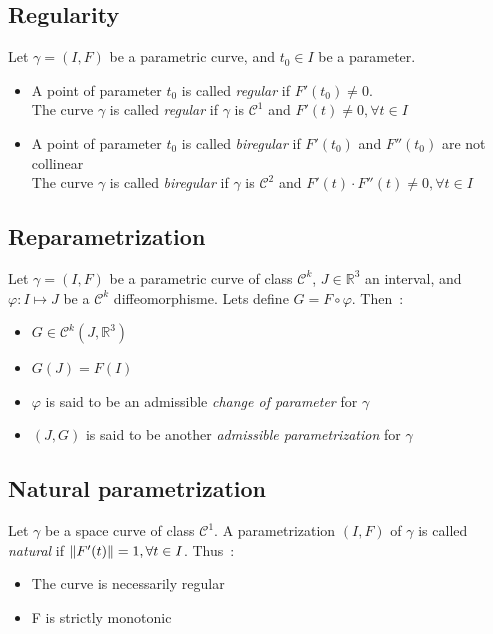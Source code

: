 \subsection{Regularity}
Let $\gamma=(I,F)$ be a parametric curve, and $t_0 \in I$ be a parameter.
\begin{itemize}
	\item A point of parameter $t_0$ is called \emph{regular} if $F'(t_0) \neq 0$.
	\\The curve $\gamma$ is called \emph{regular} if $\gamma$ is $\mathcal{C}^{1}$ and $F'(t) \neq 0, \forall t \in I$
	\item A point of parameter $t_0$ is called \emph{biregular} if $F'(t_0)$ and $F''(t_0)$ are not collinear
	\\The curve $\gamma$ is called \emph{biregular} if $\gamma$ is $\mathcal{C}^{2}$ and  $F'(t)\cdot    F''(t) \neq 0, \forall t \in I$
\end{itemize}

\subsection{Reparametrization}
Let $\gamma=(I,F)$ be a parametric curve of class ${\mathcal{C}}^{k}$, $J \in {\mathbb{R}}^{3}$ an interval, and $\varphi\colon I\mapsto J$ be a ${\mathcal{C}}^{k}$ diffeomorphisme. Lets define $G=F\circ\varphi$. Then~:
\begin{itemize}
	\item $G\in{\mathcal{C}}^{k}(J,{\mathbb{R}}^3)$
	\item $G(J)=F(I)$
	\item $\varphi$ is said to be an admissible \emph{change of parameter} for $\gamma$
	\item  $(J,G)$ is said to be another \emph{admissible parametrization} for $\gamma$
\end{itemize}

\subsection{Natural parametrization}
Let $\gamma$ be a space curve of class ${\mathcal{C}}^{1}$. A parametrization $(I,F)$ of $\gamma$ is called \emph{natural} if $\lVert F'(t)\rVert = 1, \forall t \in I$. Thus~:
\begin{itemize}
	\item The curve is necessarily regular
	\item F is strictly monotonic
\end{itemize}

